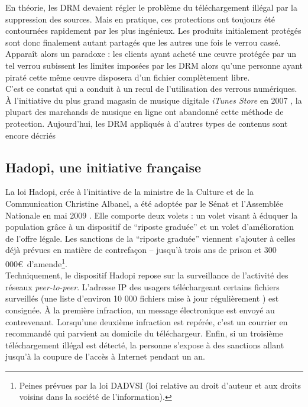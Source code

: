 \documentclass[a4paper]{report}
\begin{document}
		En théorie, les DRM devaient régler le problème du téléchargement illégal par la suppression des sources. Mais en pratique, ces protections ont toujours été contournées rapidement par les plus ingénieux. Les produits initialement protégés sont donc finalement autant partagés que les autres une fois le verrou cassé. Apparaît alors un paradoxe : les clients ayant acheté une œuvre protégée par un tel verrou subissent les limites imposées par les DRM alors qu'une personne ayant piraté cette même œuvre disposera d'un fichier complètement libre.\\

		C'est ce constat qui a conduit à un recul de l'utilisation des verrous numériques. À l'initiative du plus grand magasin de musique digitale \emph{iTunes Store} en 2007 \cite{itunes-plus-release}, la plupart des marchands de musique en ligne ont abandonné cette méthode de protection. Aujourd'hui, les DRM appliqués à d'autres types de contenus sont encore décriés

		\subsection{Hadopi, une initiative française}
		La loi Hadopi, crée à l'initiative de la ministre de la Culture et de la Communication Christine Albanel, a été adoptée par le Sénat et l'Assemblée Nationale en mai 2009 \cite{hadopi-adoption}. Elle comporte deux volets : un volet visant à éduquer la population grâce à un dispositif de ``riposte graduée'' et un volet d'amélioration de l'offre légale. Les sanctions de la ``riposte graduée'' viennent s'ajouter à celles déjà prévues en matière de contrefaçon – jusqu'à trois ans de prison et 300 000\euro\ d'amende\footnote{Peines prévues par la loi DADVSI (loi relative au droit d’auteur et aux droits voisins dans la société de l’information).}.\\

		Techniquement, le dispositif Hadopi repose sur la surveillance de l'activité des réseaux \emph{peer-to-peer}. L'adresse IP des usagers téléchargeant certains fichiers surveillés (une liste d'environ 10 000 fichiers mise à jour régulièrement \cite{hadopi-fichiers-surveilles}) est consignée. À la première infraction, un message électronique est envoyé au contrevenant. Lorsqu'une deuxième infraction est repérée, c'est un courrier en recommandé qui parvient au domicile du téléchargeur. Enfin, si un troisième téléchargement illégal est détecté, la personne s'expose à des sanctions allant jusqu'à la coupure de l'accès à Internet pendant un an.\\
\end{document}
